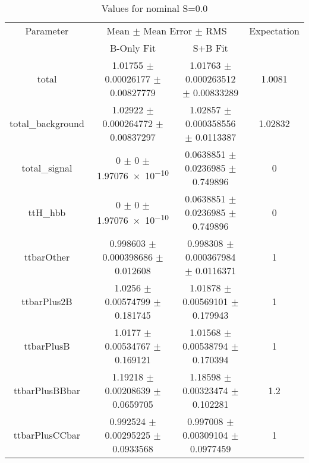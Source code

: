 \begin{table}
\centering
\caption{Values for nominal S=0.0}
\begin{tabular}{cccc}
\toprule
Parameter & \multicolumn{2}{c}{Mean $\pm$ Mean Error $\pm$ RMS} & Expectation\\
 & B-Only Fit & S+B Fit & \\
\midrule
total & \num{1.01755} $\pm$ \num{0.00026177} $\pm$ \num{0.00827779} & \num{1.01763} $\pm$ \num{0.000263512} $\pm$ \num{0.00833289} & \num{1.0081}\\
total\_background & \num{1.02922} $\pm$ \num{0.000264772} $\pm$ \num{0.00837297} & \num{1.02857} $\pm$ \num{0.000358556} $\pm$ \num{0.0113387} & \num{1.02832}\\
total\_signal & \num{0} $\pm$ \num{0} $\pm$ \num{1.97076e-10} & \num{0.0638851} $\pm$ \num{0.0236985} $\pm$ \num{0.749896} & \num{0}\\
ttH\_hbb & \num{0} $\pm$ \num{0} $\pm$ \num{1.97076e-10} & \num{0.0638851} $\pm$ \num{0.0236985} $\pm$ \num{0.749896} & \num{0}\\
ttbarOther & \num{0.998603} $\pm$ \num{0.000398686} $\pm$ \num{0.012608} & \num{0.998308} $\pm$ \num{0.000367984} $\pm$ \num{0.0116371} & \num{1}\\
ttbarPlus2B & \num{1.0256} $\pm$ \num{0.00574799} $\pm$ \num{0.181745} & \num{1.01878} $\pm$ \num{0.00569101} $\pm$ \num{0.179943} & \num{1}\\
ttbarPlusB & \num{1.0177} $\pm$ \num{0.00534767} $\pm$ \num{0.169121} & \num{1.01568} $\pm$ \num{0.00538794} $\pm$ \num{0.170394} & \num{1}\\
ttbarPlusBBbar & \num{1.19218} $\pm$ \num{0.00208639} $\pm$ \num{0.0659705} & \num{1.18598} $\pm$ \num{0.00323474} $\pm$ \num{0.102281} & \num{1.2}\\
ttbarPlusCCbar & \num{0.992524} $\pm$ \num{0.00295225} $\pm$ \num{0.0933568} & \num{0.997008} $\pm$ \num{0.00309104} $\pm$ \num{0.0977459} & \num{1}\\
\bottomrule
\end{tabular}
\end{table}